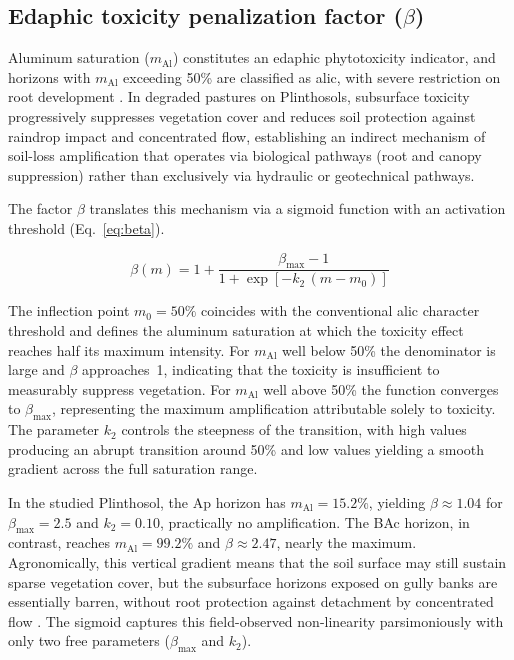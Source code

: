 \documentclass[preprint,review,12pt,authoryear]{elsarticle}
\begin{document}
\subsection{Edaphic toxicity penalization factor ($\beta$)}

Aluminum saturation ($m_{\mathrm{Al}}$) constitutes an edaphic phytotoxicity indicator, and horizons with $m_{\mathrm{Al}}$ exceeding 50\% are classified as alic, with severe restriction on root development \citep{embrapa_2018}. In degraded pastures on Plinthosols, subsurface toxicity progressively suppresses vegetation cover and reduces soil protection against raindrop impact and concentrated flow, establishing an indirect mechanism of soil-loss amplification that operates via biological pathways (root and canopy suppression) rather than exclusively via hydraulic or geotechnical pathways.

The factor $\beta$ translates this mechanism via a sigmoid function with an activation threshold (Eq.~\ref{eq:beta}).

\begin{equation}
\beta(m) = 1 + \frac{\beta_{\max} - 1}{1 + \exp\!\left[-k_2\,(m - m_0)\right]}
\label{eq:beta}
\end{equation}

The inflection point $m_0 = 50\%$ coincides with the conventional alic character threshold and defines the aluminum saturation at which the toxicity effect reaches half its maximum intensity. For $m_{\mathrm{Al}}$ well below 50\% the denominator is large and $\beta$ approaches~1, indicating that the toxicity is insufficient to measurably suppress vegetation. For $m_{\mathrm{Al}}$ well above 50\% the function converges to $\beta_{\max}$, representing the maximum amplification attributable solely to toxicity. The parameter $k_2$ controls the steepness of the transition, with high values producing an abrupt transition around 50\% and low values yielding a smooth gradient across the full saturation range.

In the studied Plinthosol, the Ap horizon has $m_{\mathrm{Al}} = 15.2\%$, yielding $\beta \approx 1.04$ for $\beta_{\max} = 2.5$ and $k_2 = 0.10$, practically no amplification. The BAc horizon, in contrast, reaches $m_{\mathrm{Al}} = 99.2\%$ and $\beta \approx 2.47$, nearly the maximum. Agronomically, this vertical gradient means that the soil surface may still sustain sparse vegetation cover, but the subsurface horizons exposed on gully banks are essentially barren, without root protection against detachment by concentrated flow \citep{vannoppen_2015}. The sigmoid captures this field-observed non-linearity parsimoniously with only two free parameters ($\beta_{\max}$ and $k_2$).
\end{document}
